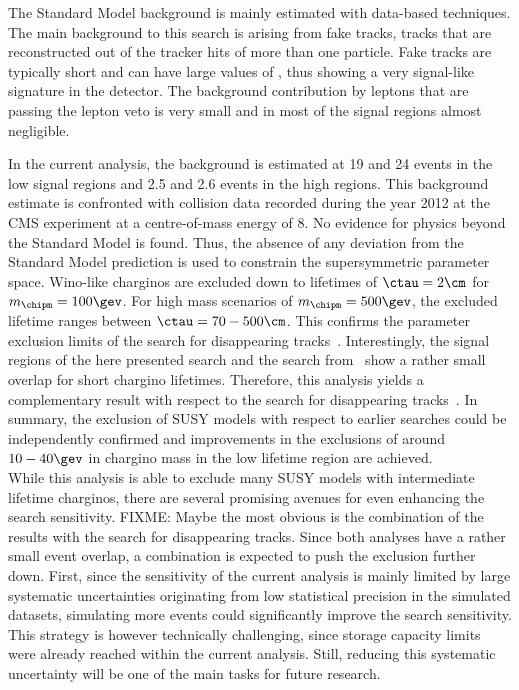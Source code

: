 The Standard Model background is mainly estimated with data-based techniques.
The main background to this search is arising from fake tracks, \ie tracks that are reconstructed out of the tracker hits of more than one particle.
Fake tracks are typically short and can have large values of \ias, thus showing a very signal-like signature in the detector.
The background contribution by leptons that are passing the lepton veto is very small and in most of the signal regions almost negligible.

In the current analysis, the background is estimated at 19 and 24 events in the low \ias signal regions and 2.5 and 2.6 events in the high \ias regions.
This background estimate is confronted with collision data recorded during the year 2012 at the CMS experiment at a centre-of-mass energy of 8\tev.
No evidence for physics beyond the Standard Model is found. %
Thus, the absence of any deviation from the Standard Model prediction is used to constrain the supersymmetric parameter space.
Wino-like charginos are excluded down to lifetimes of $\ctau=2\cm$ for $m_{\chipm}=100\gev$.
For high mass scenarios of $m_{\chipm}=500\gev$, the excluded lifetime ranges between $\ctau=70-500\cm$.
This confirms the parameter exclusion limits of the search for disappearing tracks~\cite{bib:CMS:DT_8TeV}.
Interestingly, the signal regions of the here presented search and the search from~\cite{bib:CMS:DT_8TeV} show a rather small overlap for short chargino lifetimes.
Therefore, this analysis yields a complementary result with respect to the search for disappearing tracks~\cite{bib:CMS:DT_8TeV}.
In summary, the exclusion of SUSY models with respect to earlier searches could be independently confirmed and improvements in the exclusions of around $10-40\gev$ in chargino mass in the low lifetime region are achieved.\\


While this analysis is able to exclude many SUSY models with intermediate lifetime charginos, there are several promising avenues for even enhancing the search sensitivity.
FIXME:
Maybe the most obvious is the combination of the results with the search for disappearing tracks.
Since both analyses have a rather small event overlap, a combination is expected to push the exclusion further down. 
First, since the sensitivity of the current analysis is mainly limited by large systematic uncertainties originating from low statistical precision in the simulated datasets, simulating more events could significantly improve the search sensitivity.
This strategy is however technically challenging, since storage capacity limits were already reached within the current analysis.
Still, reducing this systematic uncertainty will be one of the main tasks for future research.

